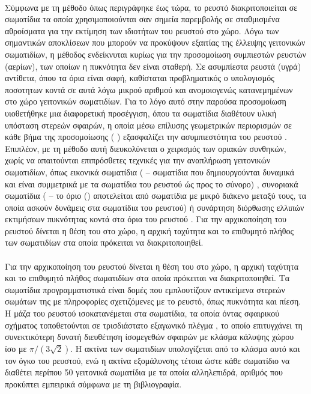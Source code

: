 \paragraph{} Σύμφωνα με τη μέθοδο  όπως περιγράφηκε έως τώρα, το ρευστό
διακριτοποιείται σε σωματίδια τα οποία χρησιμοποιούνται σαν σημεία παρεμβολής σε
σταθμισμένα αθροίσματα για την εκτίμηση των ιδιοτήτων του ρευστού στο χώρο. Λόγω των
σημαντικών αποκλίσεων που μπορούν να προκύψουν εξαιτίας της έλλειψης γειτονικών
σωματιδίων, η μέθοδος ενδείκνυται κυρίως για την προσομοίωση συμπιεστών ρευστών (αερίων),
των οποίων η πυκνότητα δεν είναι σταθερή. Σε ασυμπίεστα ρευστά (υγρά) αντίθετα, όπου τα
όρια είναι σαφή, καθίσταται προβληματικός ο υπολογισμός ποσοτητων κοντά σε αυτά λόγω
μικρού αριθμού και ανομοιογενώς κατανεμημένων στο χώρο γειτονικών σωματιδίων. Για το λόγο
αυτό στην παρούσα προσομοίωση υιοθετήθηκε μια διαφορετική προσέγγιση, όπου τα σωματίδια
διαθέτουν υλική υπόσταση στερεών σφαιρών, η οποία μέσω επίλυσης γεωμετρικών περιορισμών σε
κάθε βήμα της προσομοίωσης ( \cite{Muller2007109})
εξασφαλίζει την ασυμπιεστότητα του ρευστού \cite{macklin2013position}. Επιπλέον, με τη
μέθοδο αυτή διευκολύνεται ο χειρισμός των οριακών συνθηκών, χωρίς να απαιτούνται
επιπρόσθετες τεχνικές για την αναπλήρωση γειτονικών σωματιδίων, όπως εικονικά σωματίδια
( -- σωματίδια που δημιουργούνται δυναμικά και είναι συμμετρικά με τα
σωματίδια του ρευστού ώς προς το σύνορο) \cite{Colagrossi2003448}, συνοριακά σωματίδια
( -- το όριο () αποτελείται από σωματίδια με μικρό
διάκενο μεταξύ τους, τα οποία ασκούν δυνάμεις στα σωματίδια του ρευστού)
\cite{Monaghan20091811} ή συνάρτηση διόρθωσης ελλιπών εκτιμήσεων πυκνότητας κοντά στα όρια
του ρευστού \cite{Feldman2007295}. Για την αρχικοποίηση του ρευστού δίνεται η θέση του στο
χώρο, η αρχική ταχύτητα και το επιθυμητό πλήθος των σωματιδίων στα οποία πρόκειται να
διακριτοποιηθεί.

\paragraph{} Για την αρχικοποίηση του ρευστού δίνεται η θέση του στο χώρο, η αρχική
ταχύτητα και το επιθυμητό πλήθος σωματιδίων στα οποία πρόκειται να διακριτοποιηθεί. Τα
σωματίδια προγραμματιστικά είναι δομές  που εμπλουτίζουν αντικείμενα στερεών
σωμάτων  της  με πληροφορίες σχετιζόμενες με το ρευστό, όπως
πυκνότητα και πίεση. Η μάζα του ρευστού ισοκατανέμεται στα σωματίδια, τα οποία όντας
σφαιρικού σχήματος τοποθετούνται σε τρισδιάστατο εξαγωνικό πλέγμα , το οποίο επιτυγχάνει τη συνεκτικότερη δυνατή διευθέτηση ίσομεγεθών
σφαιρών με κλάσμα κάλυψης χώρου ίσο με $\pi/(3\sqrt{2})$.
Η ακτίνα των σωματιδίων υπολογίζεται από το κλάσμα αυτό και τον όγκο του ρευστού, ενώ η
ακτίνα εξομάλυνσης  τέτοια ώστε κάθε σωματίδιο να διαθέτει περίπου 50 γειτονικά
σωματίδια με τα οποία αλληλεπιδρά, αριθμός που προκύπτει εμπειρικά σύμφωνα με τη
βιβλιογραφία.

